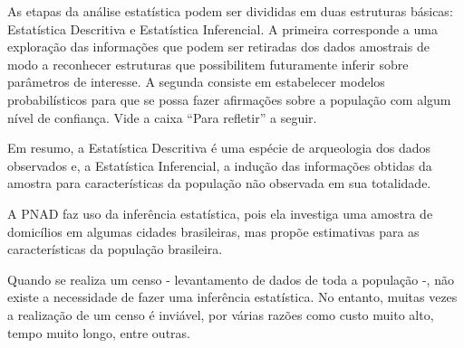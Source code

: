 As etapas da análise estatística podem ser divididas em duas estruturas básicas: Estatística Descritiva e Estatística Inferencial. A primeira corresponde a uma exploração das informações que podem ser retiradas dos dados amostrais de modo a reconhecer estruturas que possibilitem futuramente inferir sobre parâmetros de interesse. A segunda consiste em estabelecer modelos probabilísticos para que se possa fazer afirmações sobre a população com algum nível de confiança. Vide a caixa ``Para refletir'' a seguir.

Em resumo, a Estatística Descritiva é uma espécie de arqueologia dos dados observados e, a Estatística Inferencial, a indução das informações obtidas da amostra para características da população não observada em sua totalidade.

A PNAD faz uso da inferência estatística, pois ela investiga uma amostra de domicílios em algumas cidades brasileiras, mas propõe estimativas para as características da população brasileira.

Quando se realiza um censo - levantamento de dados de toda a população -, não existe a necessidade de fazer uma inferência estatística. No entanto, muitas vezes a realização de um censo é inviável, por várias razões como custo muito alto, tempo muito longo, entre outras.

